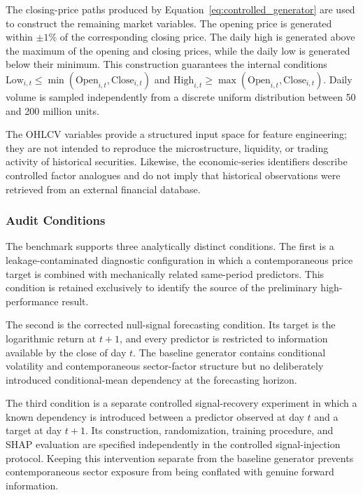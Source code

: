\documentclass[utf8]{FrontiersinHarvard} %
\begin{document}
The closing-price paths produced by Equation~\ref{eq:controlled_generator} are used to construct the remaining market variables. The opening price is generated within \(\pm1\%\) of the corresponding closing price. The daily high is generated above the maximum of the opening and closing prices, while the daily low is generated below their minimum. This construction guarantees the internal conditions
\(\mathrm{Low}_{i,t}\leq\min(\mathrm{Open}_{i,t},\mathrm{Close}_{i,t})\) and
\(\mathrm{High}_{i,t}\geq\max(\mathrm{Open}_{i,t},\mathrm{Close}_{i,t})\).
Daily volume is sampled independently from a discrete uniform distribution between 50 and 200 million units.

The OHLCV variables provide a structured input space for feature engineering; they are not intended to reproduce the microstructure, liquidity, or trading activity of historical securities. Likewise, the economic-series identifiers describe controlled factor analogues and do not imply that historical observations were retrieved from an external financial database.

\subsubsection{Audit Conditions}

The benchmark supports three analytically distinct conditions. The first is a leakage-contaminated diagnostic configuration in which a contemporaneous price target is combined with mechanically related same-period predictors. This condition is retained exclusively to identify the source of the preliminary high-performance result.

The second is the corrected null-signal forecasting condition. Its target is the logarithmic return at \(t+1\), and every predictor is restricted to information available by the close of day \(t\). The baseline generator contains conditional volatility and contemporaneous sector-factor structure but no deliberately introduced conditional-mean dependency at the forecasting horizon.

The third condition is a separate controlled signal-recovery experiment in which a known dependency is introduced between a predictor observed at day \(t\) and a target at day \(t+1\). Its construction, randomization, training procedure, and SHAP evaluation are specified independently in the controlled signal-injection protocol. Keeping this intervention separate from the baseline generator prevents contemporaneous sector exposure from being conflated with genuine forward information.
\end{document}
